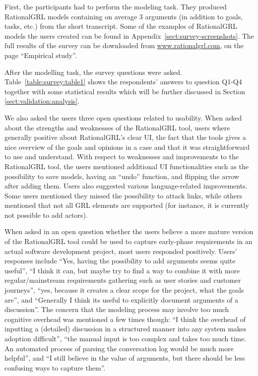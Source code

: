 First, the participants had to perform the modeling task. They produced RationalGRL models containing on average 3 arguments (in addition  to goals, tasks, etc.) from the short transcript. Some of the examples of RationalGRL models the users created can be found in Appendix~\ref{sect:survey-screenshots}. The full results of the survey can be downloaded from \url{www.rationalgrl.com}, on the page ``Empirical study''. 

After the modelling task, the survey questions were asked. Table~\ref{table:survey:table1} shows the respondents' answers to question Q1-Q4 together with some statistical results which will be further discussed in Section \ref{sect:validation:analysis}. 

We also asked the users three open questions related to usability. When asked about the strengths and weaknesses of the RationalGRL tool, users where generally positive about RationalGRL's clear UI, the fact that the tools gives a nice overview of the goals and opinions in a case and that it was straightforward to use and understand. With respect to weaknesses and improvements to the RationalGRL tool, the users mentioned additional UI functionalities such as the possibility to save models, having an ``undo'' function, and flipping the arrow after adding them. Users also suggested various language-related improvements. Some users mentioned they missed the possibility to attack links, while others mentioned that not all GRL elements are supported (for instance, it is currently not possible to add actors).

When asked in an open question whether the users believe a more mature version of the RationalGRL tool could be used to capture early-phase requirements in an actual software development project, most users responded positively. Users' responses include ``Yes, having the possibility to add arguments seems quite useful'', ``I think it can, but maybe try to find a way to combine it with more regular/mainstream requirements gathering such as user stories and customer journeys'', ``yes, because it creates a clear scope for the project, what the goals are'', and ``Generally I think its useful to explicitly document arguments of a discussion''. The concern that the modeling process may involve too much cognitive overhead was mentioned a few times though: ``I think the overhead of inputting a (detailed) discussion in a structured manner into any system makes adoption difficult'', ``the manual input is too complex and takes too much time. An automated process of parsing the conversation log would be much more helpful'', and ``I still believe in the value of arguments, but there should be less confusing ways to capture them''.


